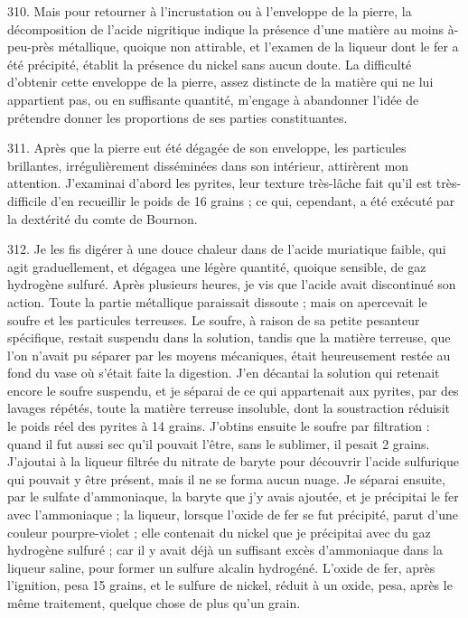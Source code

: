 \documentclass[a4paper, 11pt, oneside, polutonikogreek, french]{article}
\begin{document}
310. Mais pour retourner à l'incrustation ou à l'enveloppe de la pierre, la décomposition de l'acide nigritique indique la présence d'une matière au moins à-peu-près métallique, quoique non attirable, et l'examen de la liqueur dont le fer a été précipité, établit la présence du nickel sans aucun doute. La difficulté d'obtenir cette enveloppe de la pierre, assez distincte de la matière qui ne lui appartient pas, ou en suffisante quantité, m'engage à abandonner l'idée de prétendre donner les proportions de ses parties constituantes.

311. Après que la pierre eut été dégagée de son enveloppe, les particules brillantes, irrégulièrement disséminées dans son intérieur, attirèrent mon attention. J'examinai d'abord les pyrites, leur texture très-lâche fait qu'il est très-difficile d'en recueillir le poids de 16 grains ; ce qui, cependant, a été exécuté par la dextérité du comte de Bournon.

312. Je les fis digérer à une douce chaleur dans de l'acide muriatique faible, qui agit graduellement, et dégagea une légère quantité, quoique sensible, de gaz hydrogène sulfuré. Après plusieurs heures, je vis que l'acide avait discontinué son action. Toute la partie métallique paraissait dissoute ; mais on apercevait le soufre et les particules terreuses. Le soufre, à raison de sa petite pesanteur spécifique, restait suspendu dans la solution, tandis que la matière terreuse, que l'on n'avait pu séparer par les moyens mécaniques, était heureusement restée au fond du vase où s'était faite la digestion. J'en décantai la solution qui retenait encore le soufre suspendu, et je séparai de ce qui appartenait aux pyrites, par des lavages répétés, toute la matière terreuse insoluble, dont la soustraction réduisit le poids réel des pyrites à 14 grains. J'obtins ensuite le soufre par filtration : quand il fut aussi sec qu'il pouvait l'être, sans le sublimer, il pesait 2 grains. J'ajoutai à la liqueur filtrée du nitrate de baryte pour découvrir l'acide sulfurique qui pouvait y être présent, mais il ne se forma aucun nuage. Je séparai ensuite, par le sulfate d'ammoniaque, la baryte que j'y avais ajoutée, et je précipitai le fer avec l'ammoniaque ; la liqueur, lorsque l'oxide de fer se fut précipité, parut d'une couleur pourpre-violet ; elle contenait du nickel que je précipitai avec du gaz hydrogène sulfuré ; car il y avait déjà un suffisant excès d'ammoniaque dans la liqueur saline, pour former un sulfure alcalin hydrogéné. L'oxide de fer, après l'ignition, pesa 15 grains, et le sulfure de nickel, réduit à un oxide, pesa, après le même traitement, quelque chose de plus qu'un grain.
\end{document}
